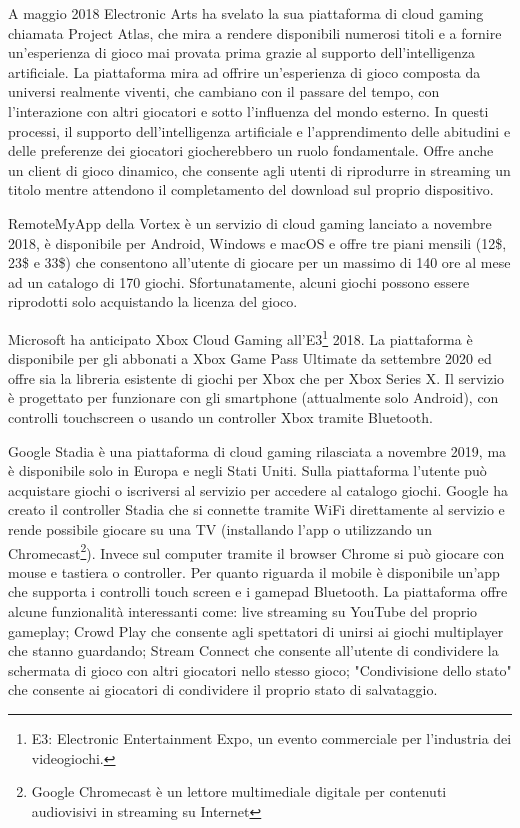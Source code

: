 A maggio 2018 Electronic Arts ha svelato la sua piattaforma di cloud gaming chiamata Project Atlas, che mira a rendere disponibili numerosi titoli e a fornire un'esperienza di gioco mai provata prima grazie al supporto dell'intelligenza artificiale. La piattaforma mira ad offrire un'esperienza di gioco composta da universi realmente viventi, che cambiano con il passare del tempo, con l'interazione con altri giocatori e sotto l'influenza del mondo esterno. In questi processi, il supporto dell'intelligenza artificiale e l'apprendimento delle abitudini e delle preferenze dei giocatori giocherebbero un ruolo fondamentale. Offre anche un client di gioco dinamico, che consente agli utenti di riprodurre in streaming un titolo mentre attendono il completamento del download sul proprio dispositivo\cite{Project_Atlas}.

RemoteMyApp della Vortex è un servizio di cloud gaming lanciato a novembre 2018, è disponibile per Android, Windows e macOS e offre tre piani mensili (12\$, 23\$ e 33\$) che consentono all'utente di giocare per un massimo di 140 ore al mese ad un catalogo di 170 giochi. Sfortunatamente, alcuni giochi possono essere riprodotti solo acquistando la licenza del gioco\cite{RemoteMyApp_Vortex}.

Microsoft ha anticipato Xbox Cloud Gaming all'E3\footnote{E3: Electronic Entertainment Expo, un evento commerciale per l'industria dei videogiochi.} 2018. La piattaforma è disponibile per gli abbonati a Xbox Game Pass Ultimate da settembre 2020 ed offre sia la libreria esistente di giochi per Xbox che per Xbox Series X. Il servizio è progettato per funzionare con gli smartphone (attualmente solo Android), con controlli touchscreen o usando un controller Xbox tramite Bluetooth\cite{Xbox_Game_Pass_cloud_gaming}.

Google Stadia è una piattaforma di cloud gaming rilasciata a novembre 2019, ma è disponibile solo in Europa e negli Stati Uniti. Sulla piattaforma l'utente può acquistare giochi o iscriversi al servizio per accedere al catalogo giochi. Google ha creato il controller Stadia che si connette tramite WiFi direttamente al servizio e rende possibile giocare su una TV (installando l'app o utilizzando un Chromecast\footnote{Google Chromecast è un lettore multimediale digitale per contenuti audiovisivi in streaming su Internet}). Invece sul computer tramite il browser Chrome si può giocare con mouse e tastiera o controller. Per quanto riguarda il mobile è disponibile un'app che supporta i controlli touch screen e i gamepad Bluetooth. La piattaforma offre alcune funzionalità interessanti come: live streaming su YouTube del proprio gameplay; Crowd Play che consente agli spettatori di unirsi ai giochi multiplayer che stanno guardando; Stream Connect che consente all'utente di condividere la schermata di gioco con altri giocatori nello stesso gioco; "Condivisione dello stato" che consente ai giocatori di condividere il proprio stato di salvataggio\cite{Google_Stadia}.

